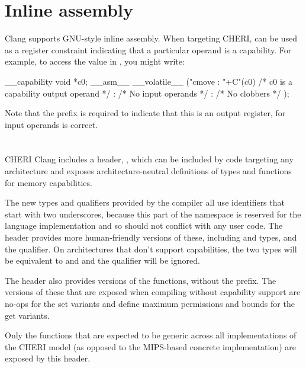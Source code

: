 \section{Inline assembly}

Clang supports GNU-style inline assembly.
When targeting CHERI,  can be used as a register constraint indicating that a particular operand is a capability.
For example, to access the value in , you might write:

\begin{csnippet}
__capability void *c0;
__asm__ __volatile__ ("cmove %
	: "+C"(c0) /* c0 is a capability output operand */
	: /* No input operands */
	: /* No clobbers */
	);
\end{csnippet}

Note that the \ccode{+} prefix is required to indicate that this is an output register, for input operands  is correct.

\section{}

CHERI Clang includes a header, , which can be included by code targeting any architecture and exposes architecture-neutral definitions of types and functions for memory capabilities.

The new types and qualifiers provided by the compiler all use identifiers that start with two underscores, because this part of the namespace is reserved for the language implementation and so should not conflict with any user code.
The  header provides more human-friendly versions of these, including  and  types, and the  qualifier.
On architectures that don't support capabilities, the two types will be equivalent to  and  and the qualifier will be ignored.

The header also provides versions of the  functions, without the  prefix.
The versions of these that are exposed when compiling without capability support are no-ops for the set variants and define maximum permissions and bounds for the get variants.

Only the functions that are expected to be generic across all implementations of the CHERI model (as opposed to the MIPS-based concrete implementation) are exposed by this header.

